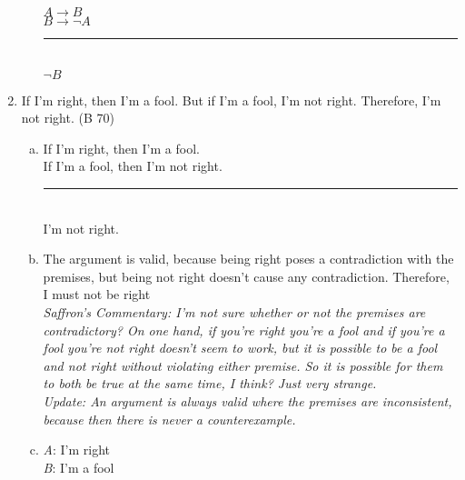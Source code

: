 \documentclass{article}
\begin{document}
\begin{enumerate}
\begin{enumerate}[(a)]
                        $A \to B$\\
                        $B \to \neg A$\\
                        \rule{5em}{.5pt}\\
                        $\neg B$
            \end{enumerate}
      \item If I'm right, then I'm a fool. But if I'm a fool, I'm not right. Therefore, I'm not right. (B 70)
            \begin{enumerate}[(a)]
                  \item If I'm right, then I'm a fool.\\
                        If I'm a fool, then I'm not right.\\
                        \rule{15em}{.5pt}\\
                        I'm not right.
                  \item The argument is valid, because being right poses a contradiction with the premises, but being not right doesn't cause any contradiction. Therefore, I must not be right\\
                        \textit{Saffron's Commentary: I'm not sure whether or not the premises are contradictory? On one hand, if you're right you're a fool and if you're a fool you're not right doesn't seem to work, but it is possible to be a fool and not right without violating either premise. So it is possible for them to both be true at the same time, I think? Just very strange.\\
                              Update: An argument is always valid where the premises are inconsistent, because then there is never a counterexample.}
                  \item \textit{A}: I'm right\\
                        \textit{B}: I'm a fool\\


\end{enumerate}
\end{enumerate}
\end{document}
